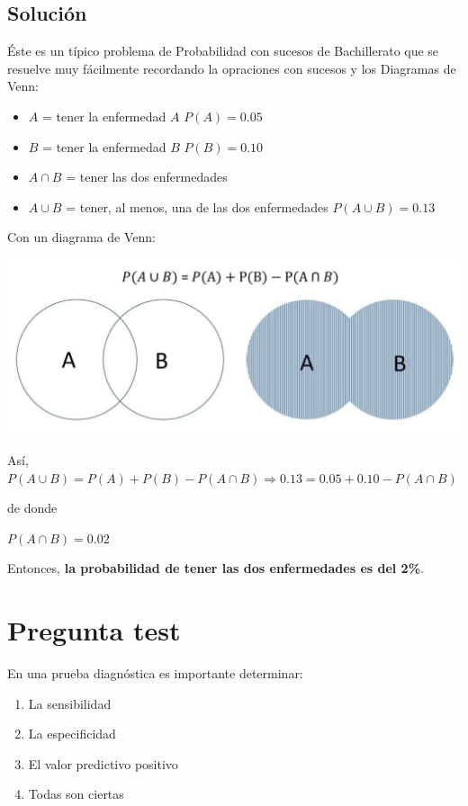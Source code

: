 \documentclass[
]{book}
\providecommand{\tightlist}{%
  \setlength{\itemsep}{0pt}\setlength{\parskip}{0pt}}
\begin{document}
\hypertarget{soluciuxf3n-10}{%
\subsection{Solución}\label{soluciuxf3n-10}}

Éste es un típico problema de Probabilidad con sucesos de Bachillerato que se resuelve muy fácilmente recordando la opraciones con sucesos y los Diagramas de Venn:

\begin{itemize}
\tightlist
\item
  \(A\) = tener la enfermedad \(A\) \(P(A)=0.05\)
\item
  \(B\) = tener la enfermedad \(B\) \(P(B)=0.10\)
\item
  \(A \cap B\) = tener las dos enfermedades
\item
  \(A \cup B\) = tener, al menos, una de las dos enfermedades \(P(A \cup B) = 0.13\)
\end{itemize}

Con un diagrama de Venn:

\includegraphics[width=16.03in]{img/7_1}

Así, \(P(A \cup B)=P(A)+P(B)-P(A \cap B) \Rightarrow 0.13=0.05 + 0.10 - P(A \cap B)\)

de donde

\(P(A \cap B)=0.02\)

Entonces, \textbf{la probabilidad de tener las dos enfermedades es del 2\%}.

\hypertarget{pregunta-test-155}{%
\section{Pregunta test}\label{pregunta-test-155}}

En una prueba diagnóstica es importante determinar:

\begin{enumerate}
\def\labelenumi{\alph{enumi})}
\tightlist
\item
  La sensibilidad
\item
  La especificidad
\item
  El valor predictivo positivo
\item
  Todas son ciertas
\end{enumerate}
\end{document}
